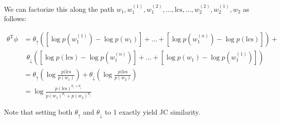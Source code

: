 \documentclass[11pt,a4paper]{article}
\begin{document}
We can factorize this along the path
  $w_1, w_1^{(1)}, w_1^{(2)}, \dots, \textrm{lcs}, \dots, w_2^{(2)},  w_2^{(1)}, w_2$
  as follows:

\begin{align*}
\theta^{\textrm{T}}\phi
  &= \theta_\uparrow \left( 
    \left[\log p(w_1^{(1)}) - \log p(w_1)\right] +
    \dots +
    \left[\log p(w_1^{(n)}) - \log p(\textrm{lcs})\right]
    \right) + \\
  &~~ \theta_\downarrow \left( 
    \left[\log p(\textrm{lcs}) - \log p(w_1^{(n)}) \right] +
    \dots +
    \left[\log p(w_1) - \log p(w_1^{(1)})\right]
    \right) \\
  &= \theta_\uparrow \left( \log \frac{p(\textrm{lcs}}{p(w_1)} \right) +
     \theta_\downarrow \left( \log \frac{p(\textrm{lcs}}{p(w_2)} \right) \\
  &= \log \frac{ p(\textrm{lcs})^{\theta_\uparrow + \theta_\downarrow} }
               { p(w_1)^{\theta_\uparrow} + p(w_2)^{\theta_\downarrow} }
\end{align*}

Note that setting both $\theta_\uparrow$ and $\theta_\downarrow$ to 1 exactly
  yield JC similarity.
\end{document}
